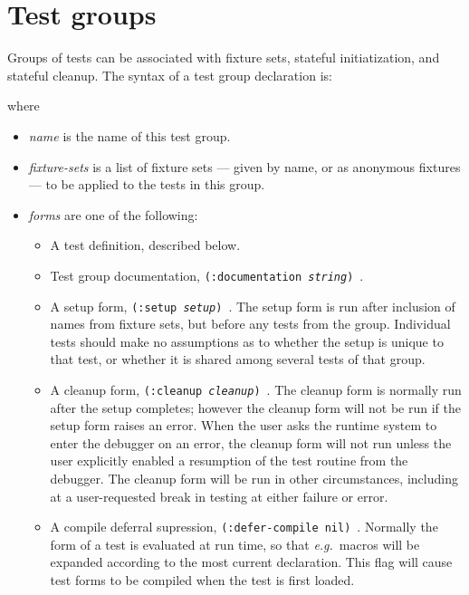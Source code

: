 
\section{Test groups}
Groups of tests can be
associated with fixture sets, stateful initiatization, and stateful
cleanup.  The syntax of a test group declaration
is:
\begin{center}
\end{center}
where
\begin{itemize}
\item\textit{name} is the name of this test group.
\item\textit{fixture-sets} is a list of fixture sets --- given by
  name, or as anonymous fixtures --- to be applied to the tests in
  this group.
\item\textit{forms} are one of the following:
\begin{itemize}
\item A test definition, described below.
\item Test group documentation, \texttt{(:documentation
    \textit{string})}~.
\item A setup form, \texttt{(:setup
    \textit{setup})}~.  The setup form is
  run after inclusion of names from fixture sets, but before any tests
  from the group.  Individual tests should make no assumptions as to
  whether the setup is unique to that test, or whether it is shared
  among several tests of that group.
\item A cleanup form, \texttt{(:cleanup
    \textit{cleanup})}~.  The
  cleanup form is normally run after the setup completes; however the
  cleanup form will not be run if the setup form raises an error.
  When the user asks the runtime system to enter the debugger on an
  error, the cleanup form will not run unless the user explicitly
  enabled a resumption of the test routine from the debugger.  The
  cleanup form will be run in other circumstances, including at a
  user-requested break in testing at either failure or error.
\item A compile deferral supression, \texttt{(:defer-compile
    nil)}~.  Normally the
  form of a test is evaluated at run time, so that \emph{e.g.}\ macros
  will be expanded according to the most current declaration.  This
  flag will cause test forms to be compiled when the test is first
  loaded.
\end{itemize}
\end{itemize}

